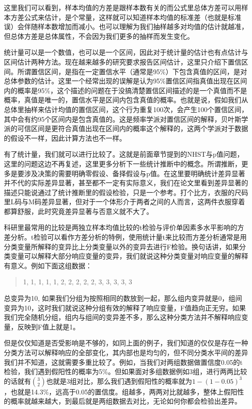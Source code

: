 \documentclass[]{tufte-book}
\begin{document}
这里我们可以看到，样本均值的方差是跟样本数有关的而公式里总体方差可以用样本方差公式来估计，是个常量，这样就可以知道样本均值的标准差（也就是标准误）会伴随样本数增加而减小。也可以理解为我们抽样越多对均值的估计就越准，但总体方差是总体属性，不会因为我们更多的抽样而发生变化。

统计量可以是一个数值，也可以是一个区间，因此对于统计量的估计也有点估计与区间估计两种方法。现在越来越多的研究要求报告区间估计，这里只介绍下置信区间。所谓置信区间，是指在一定置信水平（通常是95\%）下包含真值的区间，是对总体参数的估计。这里一个经常出现的误解是认为95\%置信区间指真值出现在区间内的概率是95\%，这个描述的问题在于没搞清楚置信区间描述的是一个真值而不是概率，真值是唯一的，置信水平是区间内包含真值的概率。也就是说，假如我们从总体里抽样来估计均值的置信区间，这个行为重复100次，会产生100个置信区间，其中会有约95个区间内是包含真值的。这是频率学派对置信区间的解释，贝叶斯学派的可信区间是更符合真值出现在区间内的概率这个解释的，这两个学派对于数据的假设不一样，因此计算方法也不一样。

有了统计量，我们就可以进行比较了。这就是前面章节提到的NHST与p值问题，这里的问题这边不再复述，这里更多分析下一些统计推断中的概念。所谓推断，更多是要涉及决策的需要明确零假设、备择假设与p值。在这里要明确统计差异显著并不代的实际差异显著，甚至都不一定有实际意义，我们在论文里看到差异显著的描述只能说通过了统计推断里的假设检验，只是一个参考。打个比方，衣服的尺码里L码与M码差异显著，但对于一个体形介于两者之间的人而言，这两件衣服穿着都算舒服，此时究竟差异显著与否意义就不大了。

科研里最常用的比较是两独立样本均值比较的t检验与评价单因素多水平影响的方差分析。t检验可以看作方差分析的特例，使用统计量t来比较而方差分析通常是用分类变量所解释的变异比上分类变量以外的变异去进行F检验。换句话讲，如果分类变量可以解释大部分响应变量的变异，我们就说这种分类变量对响应变量的解释有意义。例如下面这组数据：

\begin{quote}
1, 1, 1, 1, 1, 2, 2, 2, 2, 2, 3, 3, 3, 3, 3
\end{quote}

总变异为10, 如果我们分组为按照相同的数放到一起，那么组内变异就是0，组间变异为10，这时我们就说这种分组有效的解释了响应变量，F值趋向正无穷。如果我们完全随机分组，组内与组间的变异差不多，那么这种分类方法并不解释响应变量，反映到F值上就是1。

但是仅仅知道是否受影响是不够的，如同上面的例子，我们知道的仅仅是存在一种分类方法可以解释响应的全部变化，其内部也是均匀的，但不同分类水平间的差异我们并不知道，这就需要多重比较了。例如，当我们对两组数据做置信度0.05的t检验，我们遇到假阳性的概率为5\%。但如果面对多组数据例如3组，进行两两比较的话就有\(3\choose2\)也就是3组对比，那么我们遇到假阳性的概率就为\(1-(1-0.05)^3\)，也就是14.3\%，远高于0.05的置信度。组越多，两两对比就越多，整体上假阳性的概率就越来越大，到最后就是两组数据去对比，无论如何你都会检验出差异。
\end{document}
